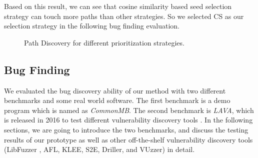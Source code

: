 Based on this result, we can see that cosine similarity based seed selection strategy can touch more paths than other strategies. So we selected CS as our selection strategy in the following bug finding evaluation.
\begin{figure}
  \caption{Path Discovery for different prioritization strategies.}
  \label{path-detail}
\end{figure} 

\subsection{Bug Finding}
We evaluated the bug discovery ability of our method with two different benchmarks and some real world software. The first benchmark is a demo program which is named as \emph{CommonMB}. The second benchmark is \emph{LAVA}, which is released in 2016 to test different vulnerability discovery tools \cite{dolan2016lava}. In the following sections, we are going to introduce the two benchmarks, and discuss the testing results of our prototype as well as other off-the-shelf vulnerability discovery tools (LibFuzzer \cite{libfuzzer}, AFL, KLEE, S2E, Driller, and VUzzer) in detail.

